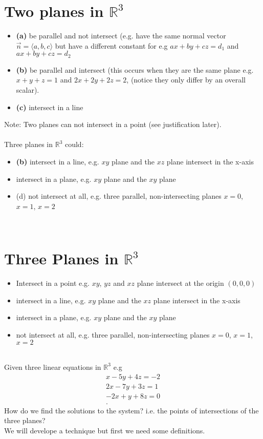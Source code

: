 \documentclass{report}
\begin{document}
 

\section{Two planes in $  \mathbb{R} ^3$}
 \begin{itemize}
        \item \textbf{(a)} be parallel and not intersect (e.g. have the same normal vector $\vec{n} = \langle a,b,c  \rangle $ but have a different constant for e.g $ax + by +cz =d_1$ and $ax+by+cz =d_2$
        \item \textbf{(b)}  be parallel and intersect (this occurs when they are the same plane e.g. $x+y+z=1$ and $2x +2y +2z =2$, (notice they only differ by an overall scalar).
        \item \textbf{(c)} intersect in a line
\end{itemize}
Note: Two planes can not intersect in a point (see justification later).\\
\\
Three planes in $\mathbb{R}^3 $ could:
\begin{itemize}
        \textbf{(a)} intersect in a point e.g. $xy$, $yz$ and $xz$ plane intersect at the origin $\left( 0,0,0 \right) $
        \item \textbf{(b)} intersect in a line, e.g. $xy$ plane and the $xz$ plane intersect in the x-axis
        \item intersect in a plane, e.g.  $xy$ plane and the $xy$ plane
        \item (d) not intersect at all, e.g. three parallel, non-intersecting planes $x=0$,  $x=1$, $x=2$
\end{itemize}
\\
\section{Three Planes in $ \mathbb{R} ^3$}
  
 \begin{itemize}
   \item Intersect in a point e.g. $xy$, $yz$ and $xz$ plane intersect at the origin $\left( 0,0,0 \right) $ \\
        \item  intersect in a line, e.g. $xy$ plane and the $xz$ plane intersect in the x-axis  \\
        \item intersect in a plane, e.g.  $xy$ plane and the $xy$ plane \\
        \item not intersect at all, e.g. three parallel, non-intersecting planes $x=0$,  $x=1$, $x=2$
\end{itemize}
\\
Given three linear equations in $\mathbb{R}^3$ e.g
\begin{align*}
        x-5y+4z=-2\\
        2x-7y+3z=1\\
        -2x +y +8z=0\\
.\end{align*}
How do we find the solutions to the system? i.e. the points of intersections of the three planes?\\
We will develope a technique but first we need some definitions.
\end{document}
